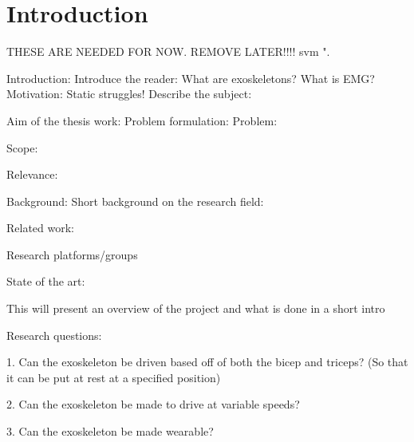 \section{Introduction}
\label{section:intro}

THESE ARE NEEDED FOR NOW. REMOVE LATER!!!! \cite{IEEEtran, IEEEtranformatexample, webpage, FundConDep, exampleofjournalarticle, exampleofconferencepaper}
\ac{svm} \cite{exampleofconferencepaper}".

Introduction:
    Introduce the reader:
        What are exoskeletons?
        What is EMG?
    Motivation:
        Static struggles!
    Describe the subject:
        

    Aim of the thesis work:
        Problem formulation:
            Problem:

            Scope:
            
            Relevance: %


Background: 
    Short background on the research field:

    Related work:

    Research platforms/groups

    State of the art:


    This will present an overview of the project and what is done in a short intro


Research questions:

1.	Can the exoskeleton be driven based off of both the bicep and triceps? (So that it can be put at rest at a specified position)

2.	Can the exoskeleton be made to drive at variable speeds?

3.	Can the exoskeleton be made wearable?

